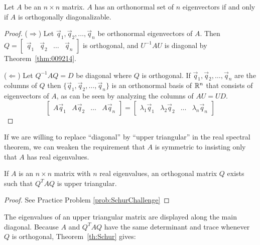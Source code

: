 \documentclass{ximera}
\begin{document}
\begin{theorem}\label{th:PrinAxesOtherStuff}
Let $A$ be an $n \times n$ matrix.  $A$ has an orthonormal set of $n$ eigenvectors if and only if $A$ is orthogonally diagonalizable.

\begin{proof}
($\Rightarrow$) Let $\vec{q}_{1}, \vec{q}_{2}, \dots, \vec{q}_{n}$ be orthonormal eigenvectors of $A$. Then $Q = \begin{bmatrix}
\vec{q}_{1} & \vec{q}_{2} & \dots & \vec{q}_{n}
\end{bmatrix}$ is orthogonal, and $U^{-1}AU$ is diagonal by Theorem~\ref{thm:009214}. 

($\Leftarrow$) Let $Q^{-1}AQ=D$ be diagonal where $Q$ is orthogonal. If $\vec{q}_{1}, \vec{q}_{2}, \dots, \vec{q}_{n}$ are the columns of $Q$ then $\{\vec{q}_{1}, \vec{q}_{2}, \dots, \vec{q}_{n}\}$ is an orthonormal basis of $\mathbb{R}^n$ that consists of eigenvectors of $A$, as can be seen by analyzing the columns of $AU=UD$.
$$\begin{bmatrix}
A \vec{q}_{1} & A \vec{q}_{2} & \dots & A \vec{q}_{n}
\end{bmatrix} = \begin{bmatrix}
\lambda_1 \vec{q}_{1} & \lambda_2 \vec{q}_{2} & \dots & \lambda_n \vec{q}_{n}
\end{bmatrix}$$

\end{proof}
\end{theorem}

If we are willing to replace ``diagonal'' by ``upper triangular'' in the real spectral theorem, we can weaken the requirement that $A$ is symmetric to insisting only that $A$ has real eigenvalues.

\begin{theorem}\label{th:Schur}
If $A$ is an $n \times n$ matrix with $n$ real eigenvalues, an orthogonal matrix $Q$ exists such that $Q^{T}AQ$ is upper triangular.
\end{theorem}

\begin{proof}
See Practice Problem \ref{prob:SchurChallenge}
\end{proof}

The eigenvalues of an upper triangular matrix are displayed along the main diagonal. Because $A$ and $Q^{T}AQ$ have the same determinant and trace whenever $Q$ is orthogonal, Theorem~\ref{th:Schur} gives:
\end{document}
